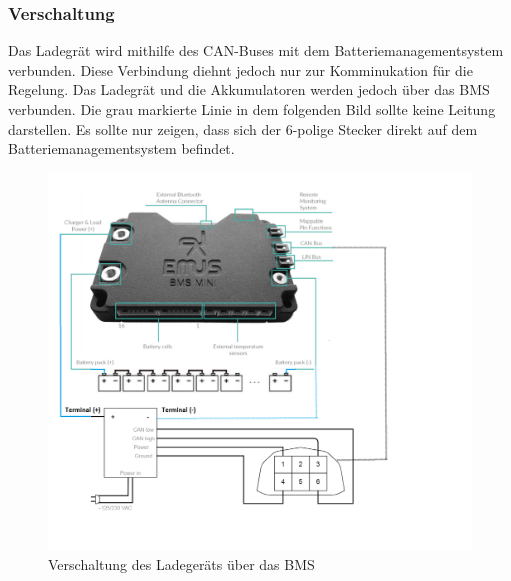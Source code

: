 \subsubsection{Verschaltung}
Das Ladegrät wird mithilfe des CAN-Buses mit dem Batteriemanagementsystem verbunden. Diese Verbindung diehnt jedoch nur zur Komminukation für die Regelung. Das Ladegrät und die Akkumulatoren werden jedoch über das BMS verbunden. Die grau markierte Linie in dem folgenden Bild sollte keine Leitung darstellen. Es sollte nur zeigen, dass sich der 6-polige Stecker direkt auf dem Batteriemanagementsystem befindet.

\begin{figure}[H]
	\begin{center}
		\includegraphics[scale=0.6]{figures/Akku/VerschaltungCharger.png}
		\caption{Verschaltung des Ladegeräts über das BMS}
		\label{fig: Verschaltung des Ladegeräts über das BMS}
	\end{center}
\end{figure}

